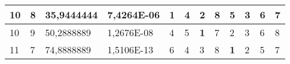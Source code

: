 \documentclass[conference]{IEEEtran}
\begin{document}
\begin{table*}[]
\begin{tabular}{|llll|llllllll|}
\multicolumn{1}{|l|}{10}                                                    & \multicolumn{1}{l|}{8}                                                        & \multicolumn{1}{l|}{35,9444444}                                                   & 7,4264E-06                     & \multicolumn{1}{l|}{\textbf{1}}                                         & \multicolumn{1}{l|}{4}                                                  & \multicolumn{1}{l|}{2}                                                  & \multicolumn{1}{l|}{8}                                                  & \multicolumn{1}{l|}{5}                                                  & \multicolumn{1}{l|}{3}                                                  & \multicolumn{1}{l|}{6}                                                  & 7                          \\ \hline
\multicolumn{1}{|l|}{10}                                                    & \multicolumn{1}{l|}{9}                                                        & \multicolumn{1}{l|}{50,2888889}                                                   & 1,2676E-08                     & \multicolumn{1}{l|}{4}                                                  & \multicolumn{1}{l|}{5}                                                  & \multicolumn{1}{l|}{\textbf{1}}                                         & \multicolumn{1}{l|}{7}                                                  & \multicolumn{1}{l|}{2}                                                  & \multicolumn{1}{l|}{3}                                                  & \multicolumn{1}{l|}{6}                                                  & 8                          \\ \hline
\multicolumn{1}{|l|}{11}                                                    & \multicolumn{1}{l|}{7}                                                        & \multicolumn{1}{l|}{74,8888889}                                                   & 1,5106E-13                     & \multicolumn{1}{l|}{6}                                                  & \multicolumn{1}{l|}{4}                                                  & \multicolumn{1}{l|}{3}                                                  & \multicolumn{1}{l|}{8}                                                  & \multicolumn{1}{l|}{\textbf{1}}                                         & \multicolumn{1}{l|}{2}                                                  & \multicolumn{1}{l|}{5}                                                  & 7                          \\ \hline

\end{tabular}
\end{table*}
\end{document}
